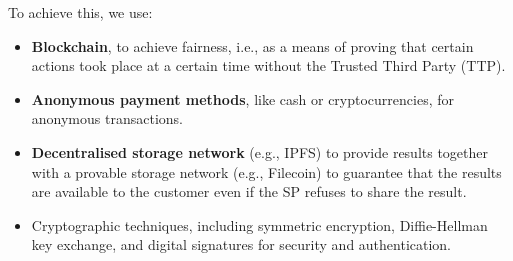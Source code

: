 \documentclass[pdftex,twocolumn,epjc3]{svjour3}
\begin{document}
\begin{sloppypar}
To achieve this, we use:
\begin{itemize}
  \item \textbf{Blockchain}, to achieve fairness, i.e., as a means of proving that certain actions took place at a certain time without the Trusted Third Party (TTP).
  \item \textbf{Anonymous payment methods}, like cash or cryptocurrencies, for anonymous transactions.
  \item \textbf{Decentralised storage network} (e.g., IPFS) to provide results together with a provable storage network (e.g., Filecoin) to guarantee that the results are available to the customer even if the SP refuses to share the result.
  \item Cryptographic techniques, including symmetric encryption, Diffie-Hellman key exchange, and digital signatures for security and authentication.
\end{itemize}
\end{sloppypar}
\end{document}
